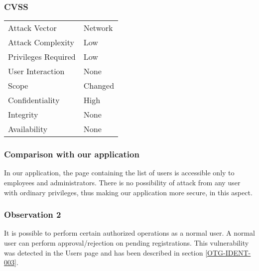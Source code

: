 \subsubsection{CVSS}
\begin{tabular}{l | l}
Attack Vector		& Network \\
Attack Complexity	& Low \\
Privileges Required & Low \\
User Interaction	& None \\
Scope				& Changed \\
Confidentiality		& High \\
Integrity			& None \\
Availability		& None
\end{tabular}

\subsubsection{Comparison with our application}
In our application, the page containing the list of users is accessible only to employees and administrators. There is no possibility of attack from any user with ordinary privileges, thus making our application more secure, in this aspect.

\subsubsection{Observation 2}
It is possible to perform certain authorized operations as a normal user. A normal user can perform approval/rejection on pending registrations.
This vulnerability was detected in the Users page and has been described in section \ref{OTG-IDENT-003}.

\clearpage